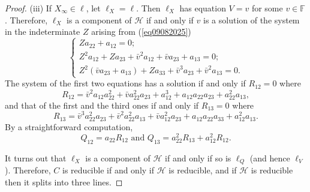 \documentclass[10pt,a4paper]{amsart}
\begin{document}
\begin{proof}
(iii) If $X_\infty\in \ell$, let $\ell_X=\ell$. Then $\ell_X$ has equation $V=v$ for some $v\in \mathbb{F}$. Therefore, $\ell_X$ is a component of $\mathcal{H}$ if and only if $v$ is a solution of the system in the indeterminate $Z$ arising from (\ref{eq09082025})
\begin{equation*}
\label{eq09082025C}
\begin{cases}Za_{22}+a_{12}=0; \\
Z^2a_{12}+Za_{23}+\bar{v}^2a_{12}+\bar{v}a_{23}+a_{13}=0;\\
Z^2(\bar{v}a_{23}+a_{13})+Za_{33}+\bar{v}^3a_{23}+\bar{v}^2a_{13}=0.
\end{cases}
\end{equation*}
The system of the first two equations has a solution if and only if
$R_{12}=0$ where
\begin{equation*}
\label{eq12082025D}
R_{12}=\bar{v}^2 a_{12}a_{22}^2+\bar{v}a_{22}^2a_{23}+a_{12}^3+a_{12}a_{22}a_{23}+a_{22}^2a_{13},
\end{equation*}
and that of the first and the third ones if and only if $R_{13}=0$ where
\begin{equation*}
\label{eq12082025DD}
R_{13}=\bar{v}^3 a_{22}^2a_{23}+\bar{v}^2a_{22}^2a_{13}+\bar{v}a_{12}^2a_{23}+a_{12}a_{22}a_{33}+a_{12}^2a_{13}.
\end{equation*}
By a straightforward computation,
$${\mbox{$Q_{12}=a_{22}R_{12}$ and $Q_{13}=a_{22}^2R_{13}+a_{12}^2R_{12}$}}.$$

It turns out that $\ell_X$ is a component of $\mathcal{H}$ if and only if so is $\ell_Q$ (and hence $\ell_V$). Therefore, $C$ is reducible if and only if $\mathcal{H}$ is reducible, and if $\mathcal{H}$ is reducible then it splits into three lines.
\end{proof}
\end{document}
